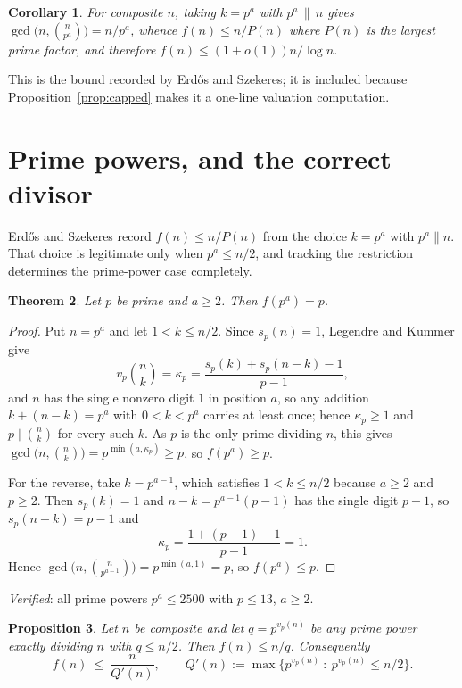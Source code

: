 \documentclass[11pt]{article}
\newtheorem{theorem}{Theorem}
\newtheorem{proposition}[theorem]{Proposition}
\newtheorem{corollary}[theorem]{Corollary}
\begin{document}
\begin{corollary}\label{cor:upper}
For composite $n$, taking $k=p^{a}$ with $p^{a}\,\|\,n$ gives
$\gcd\bigl(n,\binom{n}{p^{a}}\bigr)=n/p^{a}$, whence $f(n)\le n/P(n)$ where $P(n)$ is the
largest prime factor, and therefore $f(n)\le(1+o(1))n/\log n$.
\end{corollary}

This is the bound recorded by Erd\H{o}s and Szekeres; it is included because
Proposition~\ref{prop:capped} makes it a one-line valuation computation.

\section{Prime powers, and the correct divisor}

Erd\H{o}s and Szekeres record $f(n)\le n/P(n)$ from the choice $k=p^{a}$ with $p^{a}\|n$.
That choice is legitimate only when $p^{a}\le n/2$, and tracking the restriction determines
the prime-power case completely.

\begin{theorem}\label{thm:pp}
Let $p$ be prime and $a\ge2$.  Then $f(p^{a})=p$.
\end{theorem}

\begin{proof}
Put $n=p^{a}$ and let $1<k\le n/2$.  Since $s_p(n)=1$, Legendre and Kummer give
\[
  v_p\!\binom nk=\kappa_p=\frac{s_p(k)+s_p(n-k)-1}{p-1},
\]
and $n$ has the single nonzero digit $1$ in position $a$, so any addition $k+(n-k)=p^{a}$
with $0<k<p^{a}$ carries at least once; hence $\kappa_p\ge1$ and $p\mid\binom nk$ for every
such $k$.  As $p$ is the only prime dividing $n$, this gives
$\gcd\bigl(n,\binom nk\bigr)=p^{\min(a,\kappa_p)}\ge p$, so $f(p^{a})\ge p$.

For the reverse, take $k=p^{a-1}$, which satisfies $1<k\le n/2$ because $a\ge2$ and
$p\ge2$.  Then $s_p(k)=1$ and $n-k=p^{a-1}(p-1)$ has the single digit $p-1$, so
$s_p(n-k)=p-1$ and
\[
  \kappa_p=\frac{1+(p-1)-1}{p-1}=1 .
\]
Hence $\gcd\bigl(n,\binom{n}{p^{a-1}}\bigr)=p^{\min(a,1)}=p$, so $f(p^{a})\le p$.
\end{proof}

\emph{Verified}: all prime powers $p^{a}\le2500$ with $p\le13$, $a\ge2$.

\begin{proposition}\label{prop:qbound}
Let $n$ be composite and let $q=p^{v_p(n)}$ be any prime power exactly dividing $n$ with
$q\le n/2$.  Then $f(n)\le n/q$.  Consequently
\[
  f(n)\ \le\ \frac{n}{Q'(n)},\qquad
  Q'(n):=\max\bigl\{p^{v_p(n)}\ :\ p^{v_p(n)}\le n/2\bigr\}.
\]
\end{proposition}
\end{document}
